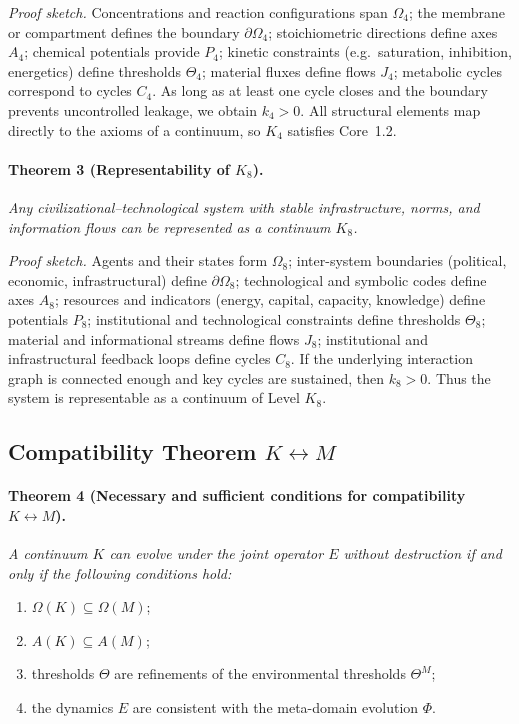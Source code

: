 \emph{Proof sketch.}
Concentrations and reaction configurations span \(\Omega_4\); the membrane or compartment defines the boundary \(\partial\Omega_4\); stoichiometric directions define axes \(A_4\); chemical potentials provide \(P_4\); kinetic constraints (e.g.\ saturation, inhibition, energetics) define thresholds \(\Theta_4\); material fluxes define flows \(J_4\); metabolic cycles correspond to cycles \(C_4\).
As long as at least one cycle closes and the boundary prevents uncontrolled leakage, we obtain \(k_4>0\).
All structural elements map directly to the axioms of a continuum, so \(K_4\) satisfies Core~1.2.

\paragraph{Theorem 3 (Representability of \texorpdfstring{\(K_8\)}{K_8}).}
\emph{Any civilizational–technological system with stable infrastructure, norms, and information flows can be represented as a continuum \(K_8\).}

\emph{Proof sketch.}
Agents and their states form \(\Omega_8\); inter-system boundaries (political, economic, infrastructural) define \(\partial\Omega_8\); technological and symbolic codes define axes \(A_8\); resources and indicators (energy, capital, capacity, knowledge) define potentials \(P_8\); institutional and technological constraints define thresholds \(\Theta_8\); material and informational streams define flows \(J_8\); institutional and infrastructural feedback loops define cycles \(C_8\).
If the underlying interaction graph is connected enough and key cycles are sustained, then \(k_8>0\).
Thus the system is representable as a continuum of Level \(K_8\).

\subsection{Compatibility Theorem \texorpdfstring{\(K\leftrightarrow M\)}{K\leftrightarrow M}}

\paragraph{Theorem 4 (Necessary and sufficient conditions for compatibility \texorpdfstring{\(K\leftrightarrow M\)}{K\leftrightarrow M}).}
\emph{A continuum \(K\) can evolve under the joint operator \(E\) without destruction if and only if the following conditions hold:}
\begin{enumerate}
  \item \(\Omega(K)\subseteq \Omega(M)\);
  \item \(A(K)\subseteq A(M)\);
  \item thresholds \(\Theta\) are refinements of the environmental thresholds \(\Theta^M\);
  \item the dynamics \(E\) are consistent with the meta-domain evolution \(\Phi\).
\end{enumerate}


